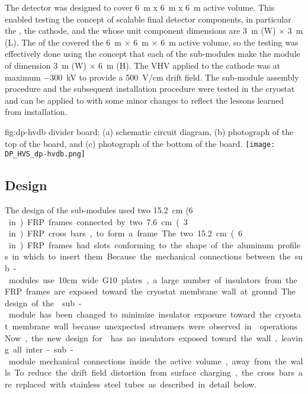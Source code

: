 The  detector was designed to cover \SI{6}{\m} x \SI{6}{\m} x \SI{6}{\m} active volume.
This enabled testing the concept of scalable final detector components, in particular the , the cathode, and the  whose unit component dimensions are \SI{3}{\m} (W) $\times$ \SI{3}{\m} (L).
The  of the  covered the \SI{6}{\m} $\times$ \SI{6}{\m} $\times$ \SI{6}{\m} active volume, so the testing was effectively done using the concept that each of the sub-modules make the  module of dimension \SI{3}{\m} (W) $\times$ \SI{6}{\m} (H).
The VHV applied to the cathode was at maximum \SI{-300}{\kV} to provide a \SI{500}{\V/\cm} drift field.
The sub-module assembly procedure and the subsequent installation procedure were tested in the cryostat and can be applied to  with some minor changes to reflect the lessons learned from  installation. 

\begin{dunefigure}{fig:dp-hvdb}{  divider board: (a) schematic circuit diagram, (b) photograph of the top of the board, and (c) photograph of the bottom of the board.}
\texttt{[image: DP\_HVS\_dp-hvdb.png]}
\end{dunefigure}

\subsection{Design}
\label{sec:fddp-hv-protodune-lessons-design}
The design of the   sub-modules used two \SI{15.2}{\cm} (\SI{6}\,in) FRP frames connected by two \SI{7.6}{\cm} (\SI{3}\,in) FRP cross bars, to form a frame. 
The two \SI{15.2}{\cm} (\SI{6}\,in) FRP frames had slots conforming to the shape of the aluminum profiles in which to insert them.
Because the mechanical connections between the sub-modules use 10cm wide G10 plates, a large number of insulators from the FRP frames are exposed toward the cryostat membrane wall at ground.
The design of the  sub-module has been changed to minimize insulator exposure toward the cryostat membrane wall because unexpected streamers were observed in  operations.  
Now, the new design for  has no insulators exposed toward the wall, leaving all inter-sub-module mechanical connections inside the active volume, away from the walls.
To reduce the drift field distortion from surface charging, the cross bars are replaced with stainless steel tubes as described in detail below.

